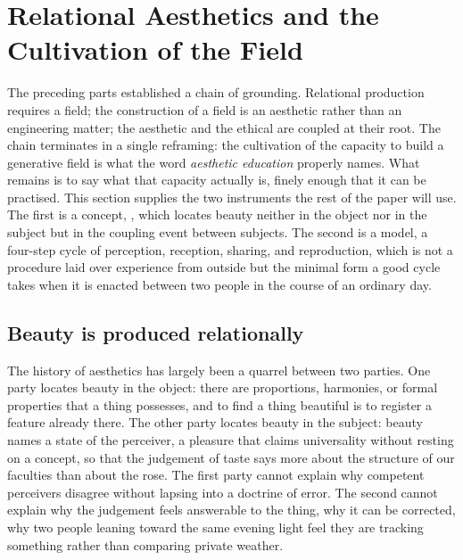 \section{Relational Aesthetics and the Cultivation of the Field}
\label{p22:sec:relational-aesthetics}

\noindent
The preceding parts established a chain of grounding. Relational production requires a field; the construction of a field is an aesthetic rather than an engineering matter; the aesthetic and the ethical are coupled at their root. The chain terminates in a single reframing: the cultivation of the capacity to build a generative field is what the word \emph{aesthetic education} properly names. What remains is to say what that capacity actually is, finely enough that it can be practised. This section supplies the two instruments the rest of the paper will use. The first is a concept, , which locates beauty neither in the object nor in the subject but in the coupling event between subjects. The second is a model, a four-step cycle of perception, reception, sharing, and reproduction, which is not a procedure laid over experience from outside but the minimal form a good cycle takes when it is enacted between two people in the course of an ordinary day.

\subsection{Beauty is produced relationally}
\label{p22:sub:beauty-relational}

The history of aesthetics has largely been a quarrel between two parties. One party locates beauty in the object: there are proportions, harmonies, or formal properties that a thing possesses, and to find a thing beautiful is to register a feature already there. The other party locates beauty in the subject: beauty names a state of the perceiver, a pleasure that claims universality without resting on a concept, so that the judgement of taste says more about the structure of our faculties than about the rose. The first party cannot explain why competent perceivers disagree without lapsing into a doctrine of error. The second cannot explain why the judgement feels answerable to the thing, why it can be corrected, why two people leaning toward the same evening light feel they are tracking something rather than comparing private weather.

